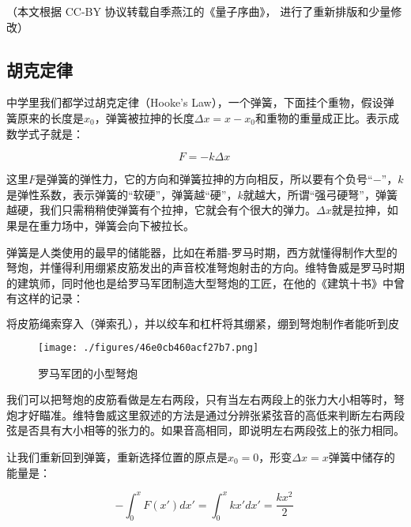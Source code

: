 
（本文根据 CC-BY 协议转载自季燕江的《量子序曲》， 进行了重新排版和少量修改）

\subsection{胡克定律}

中学里我们都学过胡克定律（Hooke's Law），一个弹簧，下面挂个重物，假设弹簧原来的长度是$x_0$，弹簧被拉抻的长度$\Delta x = x - x_0$和重物的重量成正比。表示成数学式子就是：

\begin{equation}
F = - k \Delta x~
\end{equation}

这里$F$是弹簧的弹性力，它的方向和弹簧拉抻的方向相反，所以要有个负号“$-$”，$k$是弹性系数，表示弹簧的“软硬”，弹簧越“硬”，$k$就越大，所谓“强弓硬弩”，弹簧越硬，我们只需稍稍使弹簧有个拉抻，它就会有个很大的弹力。$\Delta x$就是拉抻，如果是在重力场中，弹簧会向下被拉长。

弹簧是人类使用的最早的储能器，比如在希腊-罗马时期，西方就懂得制作大型的弩炮，并懂得利用绷紧皮筋发出的声音校准弩炮射击的方向。维特鲁威是罗马时期的建筑师，同时他也是给罗马军团制造大型弩炮的工匠，在他的《建筑十书》中曾有这样的记录：

\begin{equation}
\text{将皮筋绳索穿入（弹索孔），并以绞车和杠杆将其绷紧，绷到弩炮制作者能听到皮筋绳索发出特定音高的弦音，方可用楔子将它固定住。将弩炮的双臂扣上扳机，一旦发射，两边皮筋就应释放出一致的推力。如果它们发出的音调不一致，弩炮射出的弹丸便不可能是直线的}~
\end{equation}

\begin{figure}[ht]
\centering
\texttt{[image: ./figures/46e0cb460acf27b7.png]}
\caption{ 罗马军团的小型弩炮} \label{fig_QMPre4_1}
\end{figure}

我们可以把弩炮的皮筋看做是左右两段，只有当左右两段上的张力大小相等时，弩炮才好瞄准。维特鲁威这里叙述的方法是通过分辨张紧弦音的高低来判断左右两段弦是否具有大小相等的张力的。如果音高相同，即说明左右两段弦上的张力相同。

让我们重新回到弹簧，重新选择位置的原点是$x_0 = 0$，形变$\Delta x = x$弹簧中储存的能量是：

\begin{equation}
- \int_0^x F(x')d x' = \int_0^x k x' d x' = \frac{k x^2}{2}~
\end{equation}

